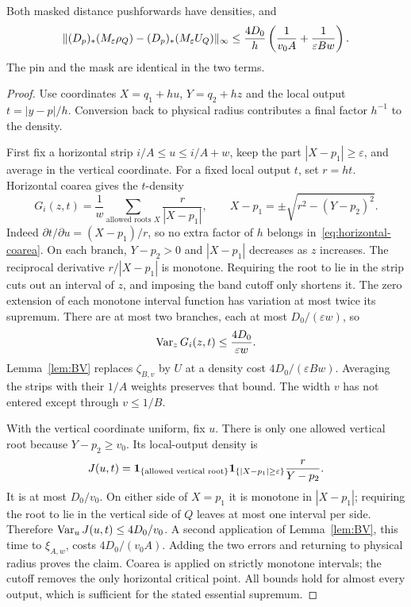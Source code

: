 \begin{lemma}\label{lem:fixed-band}
Both masked distance pushforwards have densities, and
\begin{equation}\label{eq:fixed-band}
 \lVert (D_p)_*(M_\varepsilon\rho_Q)
       -(D_p)_*(M_\varepsilon U_Q)\rVert_\infty
 \leq\frac{4D_0}{h}
       \left(\frac1{v_0A}+\frac1{\varepsilon Bw}\right).
\end{equation}
The pin and the mask are identical in the two terms.
\end{lemma}
\begin{proof}
Use coordinates $X=q_1+hu$, $Y=q_2+hz$ and the local output
$t=|y-p|/h$. Conversion back to physical radius contributes a final
factor $h^{-1}$ to the density.

First fix a horizontal strip $i/A\leq u\leq i/A+w$, keep the part
$|X-p_1|\geq\varepsilon$, and average in the vertical coordinate.
For a fixed local output $t$, set $r=ht$. Horizontal coarea gives the
$t$-density
\begin{equation}\label{eq:horizontal-coarea}
 G_i(z,t)=\frac1w\sum_{\text{allowed roots }X}\frac{r}{|X-p_1|},
 \qquad X-p_1=\pm\sqrt{r^2-(Y-p_2)^2}.
\end{equation}
Indeed $\partial t/\partial u=(X-p_1)/r$, so no extra factor of $h$
belongs in~\eqref{eq:horizontal-coarea}. On each branch, $Y-p_2>0$
and $|X-p_1|$ decreases as $z$ increases. The reciprocal derivative
$r/|X-p_1|$ is monotone. Requiring the root to lie in the strip cuts out
an interval of $z$, and imposing the band cutoff only shortens it.
The zero extension of each monotone interval function has variation at
most twice its supremum. There are at most two branches, each at most
$D_0/(\varepsilon w)$, so
\begin{equation}\label{eq:vertical-variation}
 \operatorname{Var}_z G_i(z,t)\leq\frac{4D_0}{\varepsilon w}.
\end{equation}
Lemma~\ref{lem:BV} replaces $\zeta_{B,v}$ by $U$ at a density cost
$4D_0/(\varepsilon Bw)$. Averaging the strips with their $1/A$ weights
preserves that bound. The width $v$ has not entered except through
$v\leq1/B$.

With the vertical coordinate uniform, fix $u$. There is only one allowed
vertical root because $Y-p_2\geq v_0$. Its local-output density is
\begin{equation}\label{eq:vertical-coarea}
 J(u,t)=\mathbf 1_{\{\text{allowed vertical root}\}}
        \mathbf 1_{\{|X-p_1|\geq\varepsilon\}}
        \frac{r}{Y-p_2}.
\end{equation}
It is at most $D_0/v_0$. On either side of $X=p_1$ it is monotone in
$|X-p_1|$; requiring the root to lie in the vertical side of $Q$ leaves
at most one interval per side. Therefore
$\operatorname{Var}_u J(u,t)\leq4D_0/v_0$. A second application of
Lemma~\ref{lem:BV}, this time to $\xi_{A,w}$, costs $4D_0/(v_0A)$.
Adding the two errors and returning to physical radius proves the claim.
Coarea is applied on strictly monotone intervals; the cutoff removes the
only horizontal critical point. All bounds hold for almost every output,
which is sufficient for the stated essential supremum.
\end{proof}


